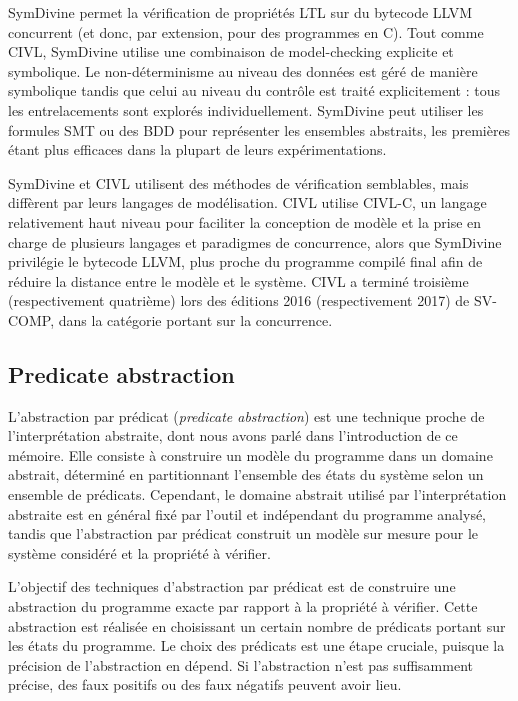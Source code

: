 SymDivine\cite{SymDivine} permet la vérification de propriétés \ac{LTL} sur du
bytecode LLVM concurrent (et donc, par extension, pour des programmes en C).
Tout comme CIVL, SymDivine utilise une combinaison de model-checking explicite
et symbolique. Le non-déterminisme au niveau des données est géré de manière
symbolique tandis que celui au niveau du contrôle est traité explicitement : tous
les entrelacements sont explorés individuellement. SymDivine peut utiliser les
formules SMT ou des \ac{BDD} pour représenter les ensembles abstraits, les premières
étant plus efficaces dans la plupart de leurs expérimentations.

SymDivine et CIVL utilisent des méthodes de vérification semblables, mais
diffèrent par leurs langages de modélisation. CIVL utilise CIVL-C, un langage
relativement haut niveau pour faciliter la conception de modèle et la prise en
charge de plusieurs langages et paradigmes de concurrence, alors que SymDivine
privilégie le bytecode LLVM, plus proche du programme compilé final afin de
réduire la distance entre le modèle et le système. CIVL a terminé troisième
(respectivement quatrième) lors des éditions 2016 (respectivement 2017) de
SV-COMP\cite{svcomp_2016_result, svcomp_2017_result}, dans la catégorie portant
sur la concurrence.

\subsection{Predicate abstraction}

L'abstraction par prédicat (\emph{predicate abstraction}) est une technique
proche de l'interprétation abstraite, dont nous avons parlé dans l'introduction
de ce mémoire. Elle consiste à construire un modèle du programme dans un
domaine abstrait, déterminé en partitionnant l'ensemble des états du système
selon un ensemble de prédicats. Cependant, le domaine abstrait utilisé par
l'interprétation abstraite est en général fixé par l'outil et
indépendant du programme analysé, tandis que l'abstraction par prédicat
construit un modèle sur mesure pour le système considéré et la propriété
à vérifier\cite{abstract_state_graph, dsilva_survey_2008}.

L'objectif des techniques d'abstraction par prédicat est de construire une
abstraction du programme exacte par rapport à la propriété à vérifier. Cette
abstraction est réalisée en choisissant un certain nombre de prédicats portant
sur les états du programme. Le choix des prédicats est une étape cruciale,
puisque la précision de l'abstraction en dépend. Si l'abstraction n'est pas
suffisamment précise, des faux positifs ou des faux négatifs peuvent avoir lieu.

